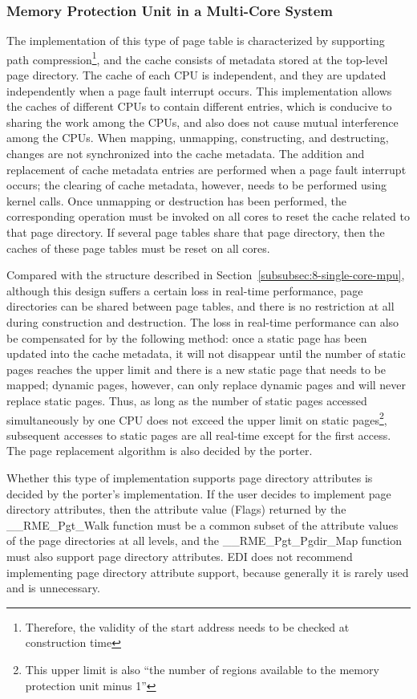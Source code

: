 \subsubsection{Memory Protection Unit in a Multi-Core System}\label{subsubsec:8-multi-core-mpu}

The implementation of this type of page table is characterized by supporting path compression\footnote{Therefore, the validity of the start address needs to be checked at construction time}, and the cache consists of metadata stored at the top-level page directory. The cache of each CPU is independent, and they are updated independently when a page fault interrupt occurs. This implementation allows the caches of different CPUs to contain different entries, which is conducive to sharing the work among the CPUs, and also does not cause mutual interference among the CPUs. When mapping, unmapping, constructing, and destructing, changes are not synchronized into the cache metadata. The addition and replacement of cache metadata entries are performed when a page fault interrupt occurs; the clearing of cache metadata, however, needs to be performed using kernel calls. Once unmapping or destruction has been performed, the corresponding operation must be invoked on all cores to reset the cache related to that page directory. If several page tables share that page directory, then the caches of these page tables must be reset on all cores.

Compared with the structure described in Section~\ref{subsubsec:8-single-core-mpu}, although this design suffers a certain loss in real-time performance, page directories can be shared between page tables, and there is no restriction at all during construction and destruction. The loss in real-time performance can also be compensated for by the following method: once a static page has been updated into the cache metadata, it will not disappear until the number of static pages reaches the upper limit and there is a new static page that needs to be mapped; dynamic pages, however, can only replace dynamic pages and will never replace static pages. Thus, as long as the number of static pages accessed simultaneously by one CPU does not exceed the upper limit on static pages\footnote{This upper limit is also ``the number of regions available to the memory protection unit minus 1''}, subsequent accesses to static pages are all real-time except for the first access. The page replacement algorithm is also decided by the porter.

Whether this type of implementation supports page directory attributes is decided by the porter's implementation. If the user decides to implement page directory attributes, then the attribute value (Flags) returned by the \_\_RME\_Pgt\_Walk function must be a common subset of the attribute values of the page directories at all levels, and the \_\_RME\_Pgt\_Pgdir\_Map function must also support page directory attributes. EDI does not recommend implementing page directory attribute support, because generally it is rarely used and is unnecessary.

